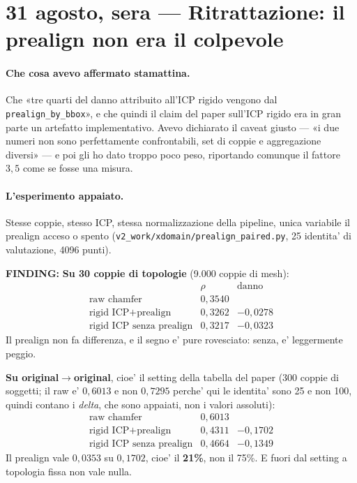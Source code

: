 \documentclass[11pt,a4paper]{article}
\newcommand{\finding}[1]{\textcolor{finding}{\textbf{FINDING:}} #1}
\begin{document}
\section{31 agosto, sera --- Ritrattazione: il prealign non era il colpevole}

\paragraph{Che cosa avevo affermato stamattina.} Che «tre quarti del danno attribuito all'ICP
rigido vengono dal \texttt{prealign\_by\_bbox}», e che quindi il claim del paper sull'ICP rigido
era in gran parte un artefatto implementativo. Avevo dichiarato il caveat giusto --- «i due
numeri non sono perfettamente confrontabili, set di coppie e aggregazione diversi» --- e poi gli
ho dato troppo poco peso, riportando comunque il fattore $3{,}5$ come se fosse una misura.

\paragraph{L'esperimento appaiato.} Stesse coppie, stesso ICP, stessa normalizzazione della
pipeline, unica variabile il prealign acceso o spento
(\texttt{v2\_work/xdomain/prealign\_paired.py}, 25 identita' di valutazione, 4096 punti).

\finding{\textbf{Su 30 coppie di topologie} (9.000 coppie di mesh):
\[
\begin{array}{lcc}
 & \rho & \text{danno} \\
\hline
\text{raw chamfer} & 0{,}3540 & \\
\text{rigid ICP} + \text{prealign} & 0{,}3262 & -0{,}0278 \\
\text{rigid ICP senza prealign} & 0{,}3217 & -0{,}0323
\end{array}
\]
Il prealign non fa differenza, e il segno e' pure rovesciato: senza, e' leggermente peggio.

\textbf{Su original$\to$original}, cioe' il setting della tabella del paper (300 coppie di
soggetti; il raw e' $0{,}6013$ e non $0{,}7295$ perche' qui le identita' sono 25 e non 100,
quindi contano i \emph{delta}, che sono appaiati, non i valori assoluti):
\[
\begin{array}{lcc}
\text{raw chamfer} & 0{,}6013 & \\
\text{rigid ICP} + \text{prealign} & 0{,}4311 & -0{,}1702 \\
\text{rigid ICP senza prealign} & 0{,}4664 & -0{,}1349
\end{array}
\]
Il prealign vale $0{,}0353$ su $0{,}1702$, cioe' il \textbf{21\%}, non il 75\%. E fuori dal
setting a topologia fissa non vale nulla.}
\end{document}
